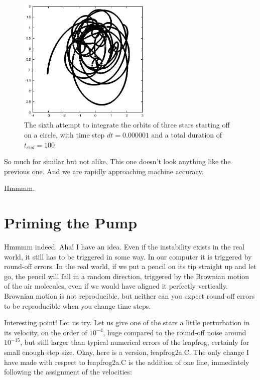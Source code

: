 \begin{figure}[htb]
\centering
\includegraphics[width=2.5in]{chap5/leapfrog2_0.000001_100.ps}
\caption[Three stars on a circle, leapfrog, $dt = 0.000001$, $t_{end} = 100$]
{The sixth attempt to integrate the orbits of three stars
starting off on a circle, with time step $dt = 0.000001$ and a total
duration of $t_{end} = 100$}
\label{fig:leap2-0.000001-100}
\end{figure}

\abc

\bob
So much for similar but not alike.  This one doesn't look anything
like the previous one.  And we are rapidly approaching machine accuracy.

\alice
Hmmmm.

\cba

\section{Priming the Pump}

\abc

\carol
Hmmmm indeed.  Aha!  I have an idea.  Even if the instability exists
in the real world, it still has to be triggered in some way.  In our
computer it is triggered by round-off errors.  In the real world, if
we put a pencil on its tip straight up and let go, the pencil will
fall in a random direction, triggered by the Brownian motion of the
air molecules, even if we would have aligned it perfectly vertically.
Brownian motion is not reproducible, but neither can you expect
round-off errors to be reproducible when you change time steps.

\alice
Interesting point!  Let us try.  Let us give one of the stars a little
perturbation in its velocity, on the order of $10^{-4}$, huge compared
to the round-off noise around $10^{-15}$, but still larger than typical
numerical errors of the leapfrog, certainly for small enough step size.
Okay, here is a version, {\st leapfrog2a.C}.  The only change I have
made with respect to {\st leapfrog2a.C} is the addition of one line,
immediately following the assignment of the velocities:

